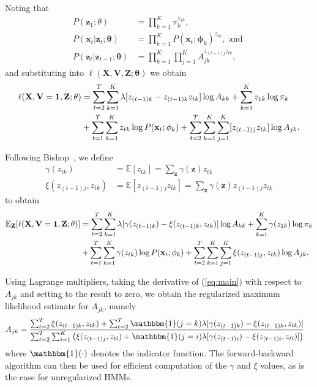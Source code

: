 Noting that 
\begin{align*}
    P(\mathbf{z}_{1}; \theta) &= \prod_{k=1}^{K}\pi_{k}^{z_{1k}}, \\
    P(\mathbf{x}_t|\mathbf{z}_t; \mathbf{\theta}) &= \prod_{k=1}^{K} P(\mathbf{x}_t ; \mathbf{\phi}_k)^{z_{tk}},\text{ and }\\ 
    P(\mathbf{z}_t|\mathbf{z}_{t-1}; \mathbf{\theta}) &= \prod_{k=1}^{K}\prod_{j=1}^{K}A_{jk}^{z_{(t-1)j}z_{tk}},
\end{align*}
and substituting into $\ell(\mathbf{X}, \mathbf{V}, \mathbf{Z} ; \mathbf{\theta})$ we obtain
\begin{align*}
    \ell(\mathbf{X}, \mathbf{V}=\mathbf{1}, \mathbf{Z} ; \mathbf{\theta}) 
    &= \sum^{T}_{t=2}\sum^{K}_{k=1}\lambda[z_{(t-1)k} - z_{(t-1)k}z_{tk}]\log A_{kk} + \sum_{k=1}^{K}{z_{1k}}\log \pi_{k} \notag\\
    &+ \sum_{t=1}^{T}\sum_{k=1}^{K} z_{tk}\log P(\mathbf{x}_t ; \mathbf{\phi}_k) + \sum_{t=2}^{T}\sum_{k=1}^{K}\sum_{j=1}^{K}[z_{(t-1)j}z_{tk}]\log A_{jk}.
\end{align*}

Following Bishop~\cite{bishop2007pattern}, we define
\begin{align*}
    \gamma(z_{tk}) &= \mathbb{E}[z_{tk}] = \sum_{\mathbf{z}}\gamma(\mathbf{z})z_{tk} \\
    \xi(z_{(t-1)j}, z_{tk}) &= \mathbb{E}[z_{(t-1)j}z_{tk}] = \sum_{\mathbf{z}}\gamma(\mathbf{z})z_{(t-1)j}z_{tk}
\end{align*}
to obtain
\begin{align}\label{eq:main}
    \mathbb{E}_{\mathbf{Z}}[\ell(\mathbf{X}, \mathbf{V}=\mathbf{1}, \mathbf{Z} ; \mathbf{\theta})]
    &= \sum^{T}_{t=2}\sum^{K}_{k=1}\lambda[\gamma(z_{(t-1)k})-\xi(z_{(t-1)k}, z_{tk})]\log A_{kk} + \sum_{k=1}^{K}\gamma(z_{1k})\log \pi_{k} \notag\\
    &+ \sum_{t=1}^{T}\sum_{k=1}^{K} \gamma(z_{tk})\log P(\mathbf{x}_t ; \mathbf{\phi}_k) + \sum_{t=2}^{T}\sum_{k=1}^{K}\sum_{j=1}^{K}\xi(z_{(t-1)j}, z_{tk})\log A_{jk}.
\end{align}

Using Lagrange multipliers, taking the derivative of (\ref{eq:main}) with respect to $A_{jk}$ and setting to the result to zero, we obtain the regularized maximum likelihood estimate for $A_{jk}$, namely
\begin{align*}
    A_{jk} &= \frac{\sum_{t=2}^{T} \xi(z_{(t-1)k}, z_{tk}) + \sum_{t=2}^{T}{\mathbbm{1}(j = k)}\lambda[\gamma(z_{(t-1)k}) - \xi(z_{(t-1)k}, z_{tk})]}   
    { \sum_{t=2}^{T} \sum_{i=1}^{K} \left(\xi(z_{(t-1)j}, z_{ti}) + {\mathbbm{1}(j = i)}\lambda[\gamma(z_{(t-1)i}) - \xi(z_{(t-1)i}, z_{ti})]\right)}
\end{align*}
where $\mathbbm{1}(\cdot)$ denotes the indicator function. The forward-backward algorithm can then be used for efficient computation of the $\gamma$ and $\xi$ values, as is the case for unregularized HMMs.

